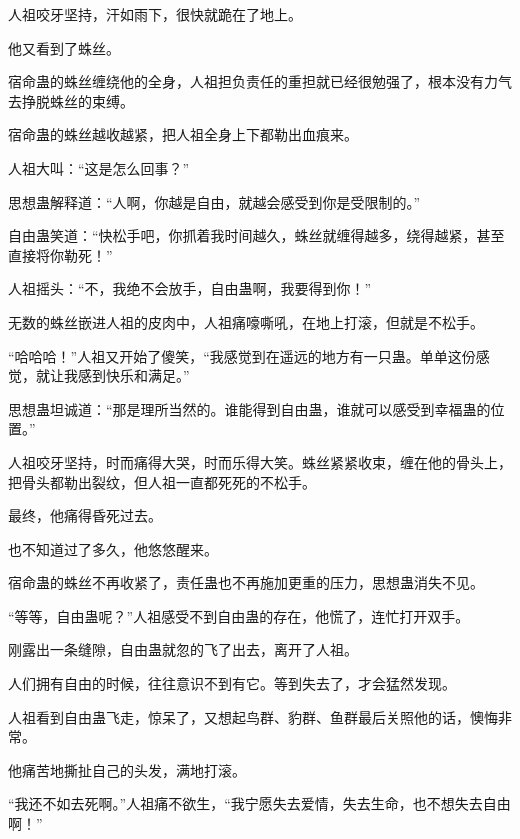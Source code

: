 \begin{this_body}
人祖咬牙坚持，汗如雨下，很快就跪在了地上。

他又看到了蛛丝。

宿命蛊的蛛丝缠绕他的全身，人祖担负责任的重担就已经很勉强了，根本没有力气去挣脱蛛丝的束缚。

宿命蛊的蛛丝越收越紧，把人祖全身上下都勒出血痕来。

人祖大叫：“这是怎么回事？”

思想蛊解释道：“人啊，你越是自由，就越会感受到你是受限制的。”

自由蛊笑道：“快松手吧，你抓着我时间越久，蛛丝就缠得越多，绕得越紧，甚至直接将你勒死！”

人祖摇头：“不，我绝不会放手，自由蛊啊，我要得到你！”

无数的蛛丝嵌进人祖的皮肉中，人祖痛嚎嘶吼，在地上打滚，但就是不松手。

“哈哈哈！”人祖又开始了傻笑，“我感觉到在遥远的地方有一只蛊。单单这份感觉，就让我感到快乐和满足。”

思想蛊坦诚道：“那是理所当然的。谁能得到自由蛊，谁就可以感受到幸福蛊的位置。”

人祖咬牙坚持，时而痛得大哭，时而乐得大笑。蛛丝紧紧收束，缠在他的骨头上，把骨头都勒出裂纹，但人祖一直都死死的不松手。

最终，他痛得昏死过去。

也不知道过了多久，他悠悠醒来。

宿命蛊的蛛丝不再收紧了，责任蛊也不再施加更重的压力，思想蛊消失不见。

“等等，自由蛊呢？”人祖感受不到自由蛊的存在，他慌了，连忙打开双手。

刚露出一条缝隙，自由蛊就忽的飞了出去，离开了人祖。

人们拥有自由的时候，往往意识不到有它。等到失去了，才会猛然发现。

人祖看到自由蛊飞走，惊呆了，又想起鸟群、豹群、鱼群最后关照他的话，懊悔非常。

他痛苦地撕扯自己的头发，满地打滚。

“我还不如去死啊。”人祖痛不欲生，“我宁愿失去爱情，失去生命，也不想失去自由啊！”

\end{this_body}

